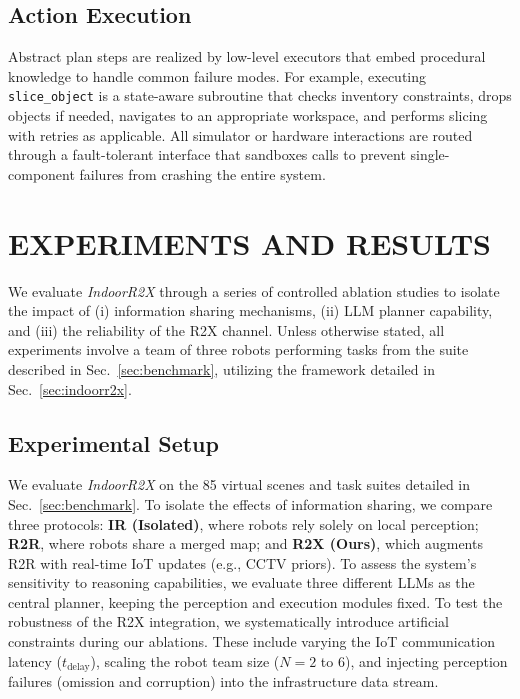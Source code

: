 \subsection{Action Execution}
\label{subsec:low_level}

Abstract plan steps are realized by low-level executors that embed procedural knowledge to handle common failure modes. For example, executing \texttt{slice\_object} is a state-aware subroutine that checks inventory constraints, drops objects if needed, navigates to an appropriate workspace, and performs slicing with retries as applicable. All simulator or hardware interactions are routed through a fault-tolerant interface that sandboxes calls to prevent single-component failures from crashing the entire system.




\section{EXPERIMENTS AND RESULTS}
\label{sec:experiments}

We evaluate \textit{IndoorR2X} through a series of controlled ablation studies to isolate the impact of (i) information sharing mechanisms, (ii) LLM planner capability, and (iii) the reliability of the R2X channel. Unless otherwise stated, all experiments involve a team of three robots performing tasks from the suite described in Sec.~\ref{sec:benchmark}, utilizing the framework detailed in Sec.~\ref{sec:indoorr2x}.


\subsection{Experimental Setup}
We evaluate \textit{IndoorR2X} on the 85 virtual scenes and task suites detailed in Sec.~\ref{sec:benchmark}. To isolate the effects of information sharing, we compare three protocols: \textbf{IR (Isolated)}, where robots rely solely on local perception; \textbf{R2R}, where robots share a merged map; and \textbf{R2X (Ours)}, which augments R2R with real-time IoT updates (e.g., CCTV priors). To assess the system's sensitivity to reasoning capabilities, we evaluate three different LLMs as the central planner, keeping the perception and execution modules fixed. To test the robustness of the R2X integration, we systematically introduce artificial constraints during our ablations. These include varying the IoT communication latency ($t_{\text{delay}}$), scaling the robot team size ($N=2$ to $6$), and injecting perception failures (omission and corruption) into the infrastructure data stream.



